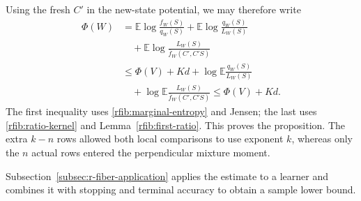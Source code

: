 Using the fresh \(C'\) in the new-state potential, we may therefore
write
\begin{align*}
 \Phi(W)
 &=\mathbb E\log\frac{f_W(S)}{q_W(S)}
   +\mathbb E\log\frac{q_W(S)}{L_W(S)}\\
 &\quad+\mathbb E\log\frac{L_W(S)}{\bar f_W(C',C'S)}\\
 &\le \Phi(V)+Kd
   +\log\mathbb E\frac{q_W(S)}{L_W(S)}\\
 &\quad+\log\mathbb E\frac{L_W(S)}{\bar f_W(C',C'S)}
 \le\Phi(V)+Kd .
\end{align*}
The first inequality uses \eqref{rfib:marginal-entropy} and Jensen;
the last uses \eqref{rfib:ratio-kernel} and
Lemma~\ref{rfib:first-ratio}.  This proves the proposition.  The
extra \(k-n\) rows allowed both local comparisons to use exponent
\(k\), whereas only the \(n\) actual rows entered the perpendicular
mixture moment.


Subsection~\ref{subsec:r-fiber-application} applies the estimate to a
learner and combines it with stopping and terminal accuracy to obtain a
sample lower bound.
